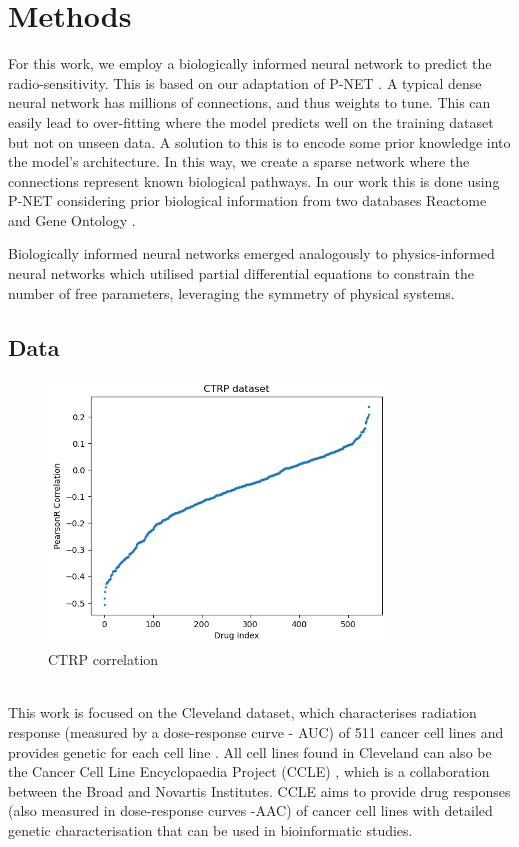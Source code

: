 \documentclass[NOTE, disdraft=true, UKenglish]{\DISCDTLATEXPATH UCLCDTDISdoc}
\begin{document}
\section{Methods}
\label{sec:method}
For this work, we employ a biologically informed neural network to predict the radio-sensitivity. This is based on our adaptation of P-NET \cite{cosmin_thesis}. A typical dense neural network has millions of connections, and thus weights to tune. This can easily lead to over-fitting where the model predicts well on the training dataset but not on unseen data. A solution to this is to encode some prior knowledge into the model's architecture. In this way, we create a sparse network where the connections represent known biological pathways. In our work this is done using P-NET \cite{elmarakeby_biologically_2021} considering prior biological information from two databases Reactome \cite{reactome} and Gene Ontology \cite{go_1,go_2}.

Biologically informed neural networks emerged analogously to physics-informed neural networks which utilised partial differential equations to constrain the number of free parameters, leveraging the symmetry of physical systems.  

\subsection{Data}
\label{sec:data}


\begin{figure}
    \centering
    \includegraphics[width=9cm]{Figures/CTRP_correlation.png}
    \caption{CTRP correlation}
    \label{CTRP correlation}
\end{figure}

\\ \indent 
This work is focused on the Cleveland dataset, which characterises radiation response (measured by a dose-response curve - AUC) of 511 cancer cell lines and provides genetic for each cell line \cite{manem}. All cell lines found in Cleveland can also be the Cancer Cell Line Encyclopaedia Project (CCLE) \cite{yard}, which is a collaboration between the Broad and Novartis Institutes. CCLE aims to provide drug responses (also measured in dose-response curves -AAC) of cancer cell lines with detailed genetic characterisation that can be used in bioinformatic studies. 
\end{document}

